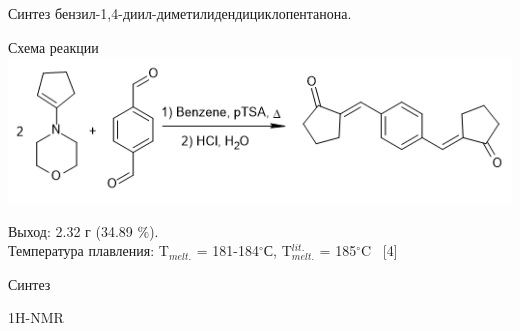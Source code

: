 \documentclass{beamer}
\begin{document}
\begin{frame}{Синтез бензил-1,4-диил-диметилидендициклопентанона.}
\begin{block}{Схема реакции}
\includegraphics[scale=0.6]{../pictures/4.png}
\end{block}
\begin{block}{}
Выход: 2.32 г (34.89 $\%$). \\
Температура плавления: T$_{melt.}$ = 181-184$^{\circ}$С, T$_{melt.}^{lit.}$ = 185$^{\circ}$C \ [4] \\
\end{block}
\end{frame}

\begin{frame}{Синтез}
\begin{block}{1H-NMR}
\end{block}
\end{frame}
\end{document}
